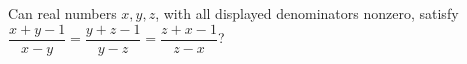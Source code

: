 Can real numbers $x,y,z$, with all displayed denominators nonzero, satisfy $\dfrac{x+y-1}{x-y}=\dfrac{y+z-1}{y-z}=\dfrac{z+x-1}{z-x}$?
